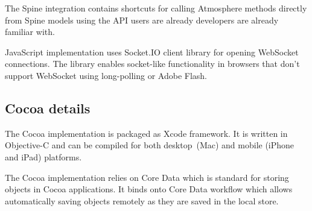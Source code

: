 The Spine integration contains shortcuts for calling Atmosphere methods directly from Spine models using the API users are already developers are already familiar with.

JavaScript implementation uses Socket.IO \citep{socketio} client library for opening WebSocket connections. The library enables socket-like functionality in browsers that don't support WebSocket using long-polling or Adobe Flash.

\subsection{Cocoa details}

The Cocoa implementation is packaged as Xcode framework. It is written in Objective-C and can be compiled for both desktop (Mac) and mobile (iPhone and iPad) platforms.

The Cocoa implementation relies on Core Data which is standard for storing objects in Cocoa applications. It binds onto Core Data workflow which allows automatically saving objects remotely as they are saved in the local store.